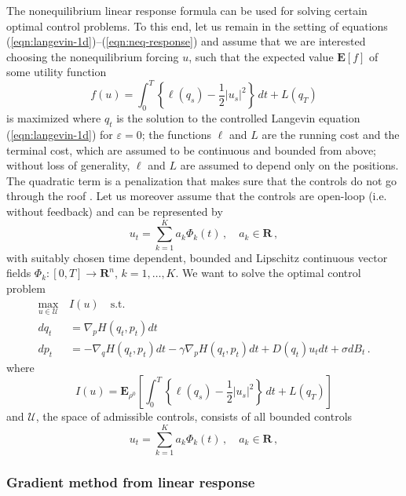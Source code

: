 \documentclass[]{tMPH2e}
\newcommand{\R}{{\mathbf R}}
\newcommand{\eps}{\varepsilon}
\newcommand{\cU}{\mathcal U}
\newcommand{\bE}{{\mathbf E}}
\begin{document}
The nonequilibrium linear response formula can be used for solving certain optimal control problems. To this end, let us remain in the setting of equations (\ref{eqn:langevin-1d})--(\ref{eqn:neq-response}) and assume that we are interested choosing the nonequilibrium forcing $u$, such that the expected value $\bE[f]$ of some utility function 
\[
f(u) = \int_{0}^{T}\left\{\ell (q_{s}) - \frac{1}{2}|u_{s}|^{2}\right\}\,dt + L(q_{T}) 
\]
is maximized where $q_{t}$ is the solution to the controlled Langevin equation (\ref{eqn:langevin-1d}) for $\eps=0$; the functions $\ell$ and $L$ are the running cost and the terminal cost, which are assumed to be continuous and bounded from above; without loss of generality, $\ell$ and $L$ are assumed to depend only on the positions. The quadratic term is a penalization that makes sure that the controls do not go through the roof \cite{schuette2012,hartmann2012}. Let us moreover assume that the controls are open-loop (i.e. without feedback) and can be represented by 
\[
u_{t} = \sum_{k=1}^K a_k \Phi_k(t)\,,\quad a_{k}\in \R\,,
\]
with suitably chosen time dependent, bounded and Lipschitz continuous vector fields $\Phi_k\colon[0,T]\to\R^{n}$, $k=1,\ldots,K$. %
We want to solve the optimal control problem
\begin{equation}\label{ocp1}
\begin{aligned}
 \max_{u\in\cU} \,& I(u)\quad \textrm{s.t.}\\
dq_t & =  \nabla_p H(q_t,p_t)dt\\
dp_t & =  -\nabla_q H(q_t,p_t)dt - \gamma \nabla_p H(q_t,p_t)dt + D(q_t)u_{t} dt+\sigma dB_t\,.
\end{aligned}
\end{equation}
where 
\begin{equation}\label{ocp2}
I(u) = \bE_{\rho^0}\left[\int_{0}^{T}\left\{\ell (q_{s}) - \frac{1}{2}|u_{s}|^{2}\right\}\,dt + L(q_{T}) \right]
\end{equation}
and $\cU$, the space of admissible controls, consists of all bounded controls 
\begin{equation}\label{admissible}
u_{t} = \sum_{k=1}^K a_k \Phi_k(t)\,,\quad a_{k}\in \R\,,
\end{equation}


\subsubsection*{Gradient method from linear response}
\end{document}
